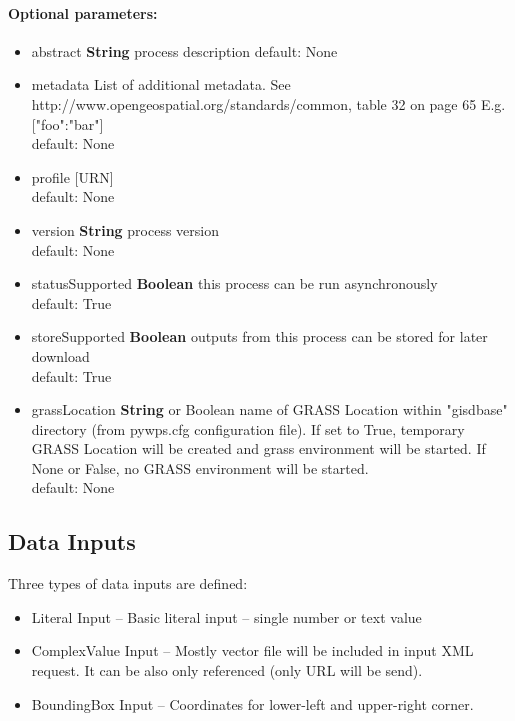 \documentclass[a4paper,11pt]{report}
\begin{document}
\paragraph{Optional parameters:}
\begin{itemize}
\item abstract \textbf{String} process description
                default: None
\item metadata List of additional metadata.  See
                    http://www.opengeospatial.org/standards/common, table 32 on page 65
                E.g. ["foo":"bar"]\\
                default: None
\item profile [URN]\\
                default: None
\item version \textbf{String} process version\\
                default: None
\item statusSupported \textbf{Boolean} this process can be run
        asynchronously\\
                default: True
\item storeSupported \textbf{Boolean} outputs from this process can be stored
                for later download\\
                default: True
\item grassLocation \textbf{String} or {Boolean} name of GRASS Location within
                "gisdbase" directory (from pywps.cfg configuration file).
                If set to True, temporary GRASS Location will be created
                and grass environment will be started. If None or False, no
                GRASS environment will be started.\\
                default: None
\end{itemize}

     
\subsection{Data Inputs}

Three types of data inputs are defined:
\begin{itemize}
    \item Literal Input -- Basic literal input -- single number or text
    value
    \item ComplexValue Input  -- Mostly vector file will be included in input XML
    request. It can be also only referenced (only URL will be send).
    \item BoundingBox Input -- Coordinates for lower-left and upper-right
    corner.
\end{itemize}
\end{document}
